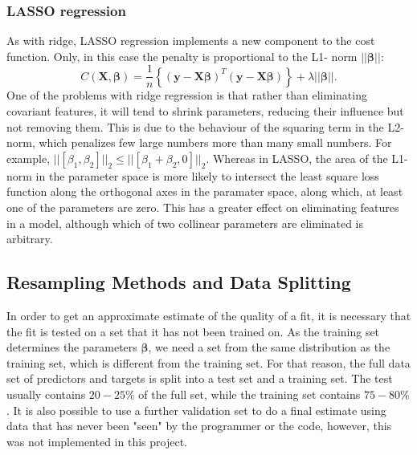 \documentclass[11pt,a4paper,titlepage]{article}
\begin{document}
\subsubsection{LASSO regression}
As with ridge, LASSO regression implements a new component to the cost function. Only, in this case the penalty is proportional to the L1- norm $\vert\vert \boldsymbol{\beta}\vert\vert$:
\begin{equation*}
    C(\boldsymbol{X},\boldsymbol{\beta})=\frac{1}{n}\left\{(\boldsymbol{y}-\boldsymbol{X}\boldsymbol{\beta})^T(\boldsymbol{y}-\boldsymbol{X}\boldsymbol{\beta})\right\}+\lambda\vert\vert \boldsymbol{\beta}\vert\vert.
\end{equation*}
One of the problems with ridge regression is that rather than eliminating covariant features, it will tend to shrink parameters, reducing their influence but not removing them. This is due to the behaviour of the squaring term in the L2- norm, which penalizes few large numbers more than many small numbers. For example, $\vert\vert[\beta_1,\beta_2]\vert\vert_2 \leq \vert\vert[\beta_1+\beta_2,0]\vert\vert_2$. Whereas in LASSO, the area of the L1- norm in the parameter space is more likely to intersect the least square loss function along the orthogonal axes in the paramater space, along which, at least one of the parameters are zero. This has a greater effect on eliminating features in a model, although which of two collinear parameters are eliminated is arbitrary.
\subsection{Resampling Methods and Data Splitting}
In order to get an approximate estimate of the quality of a fit, it is necessary that the fit is tested on a set that it has not been trained on. As the training set determines the parameters $\bm{\beta}$, we need a set from the same distribution as the training set, which is different from the training set. For that reason, the full data set of predictors and targets is split into a test set and a training set. The test usually contains $20-25\%$ of the full set, while the training set contains $75-80\%$. It is also possible to use a further validation set to do a final estimate using data that has never been "seen" by the programmer or the code, however, this was not implemented in this project.
\end{document}
